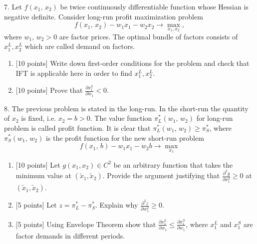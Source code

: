 \documentclass[12pt,a4paper]{article}
\begin{document}
\newpage
{}

7. Let $f({x_1},\,{x_2})$ be twice continuously differentiable function whose Hessian is negative definite. Consider long-run profit maximization problem
\[
f({x_1},\,{x_2}) - {w_1}{x_1} - {w_2}{x_2} \to \max_{x_1, x_2},
\]
where ${w_1},\,{w_2} > 0$ are factor prices. The optimal bundle of factors consists of $x_1^L, x_2^L$ which are called demand on factors.
\begin{enumerate}
\item {[10 points]} Write down first-order conditions for the problem and check that IFT is applicable here in order to find $x_1^L, x_2^L$.
\item {[10 points]} Prove that $\frac{{\partial x_1^L}}{{\partial {w_1}}} < 0$.
\end{enumerate}

\newpage
{}

8. The previous problem is stated in the long-run. In the short-run the quantity of ${x_2}$ is fixed, i.e. ${x_2} = b > 0$. The value function $\pi _L^*({w_1},\,{w_2})$ for long-run problem is called profit function. It is clear that $\pi_L^*({w_1},\,{w_2}) \geqslant \pi _S^*$, where $\pi_S^*({w_1},\,{w_2})$  is the profit function for the new short-run problem
\[
f({x_1},\,b) - {w_1}{x_1} - {w_2}b \to \max_{x_1}
\]
\begin{enumerate}
  \item {[10 points]} Let $g({x_1}, {x_2}) \in {C^2}$ be an arbitrary function that takes the minimum value at $({\tilde x_1}, {\tilde x_2})$. Provide the argument justifying that $\frac{{{\partial ^2}g}}{{\partial x_1^2}} \geqslant 0$ at $({\tilde x_1}, {\tilde x_2})$.
  \item {[5 points]} Let $z = \pi _L^* - \pi _S^*$. Explain why $\frac{{{\partial ^2}z}}{{\partial w_1^2}} \geqslant 0$.
  \item {[5 points]} Using Envelope Theorem show that $\frac{{\partial x_1^L}}{{\partial {w_1}}} \leqslant \frac{{\partial x_1^S}}{{\partial {w_1}}}$, where $x_1^L$ and $x_1^S$ are factor demands in different periods.
\end{enumerate}
\end{document}
